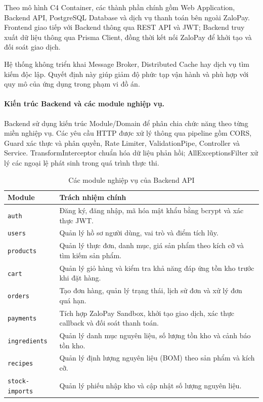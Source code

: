 Theo mô hình C4 Container, các thành phần chính gồm Web Application, Backend API, PostgreSQL Database và dịch vụ thanh toán bên ngoài ZaloPay. Frontend giao tiếp với Backend thông qua REST API và JWT; Backend truy xuất dữ liệu thông qua Prisma Client, đồng thời kết nối ZaloPay để khởi tạo và đối soát giao dịch.

Hệ thống không triển khai Message Broker, Distributed Cache hay dịch vụ tìm kiếm độc lập. Quyết định này giúp giảm độ phức tạp vận hành và phù hợp với quy mô của ứng dụng trong phạm vi đồ án.

\paragraph{Kiến trúc Backend và các module nghiệp vụ.}

Backend sử dụng kiến trúc Module/Domain để phân chia chức năng theo từng miền nghiệp vụ. Các yêu cầu HTTP được xử lý thông qua pipeline gồm CORS, Guard xác thực và phân quyền, Rate Limiter, ValidationPipe, Controller và Service. TransformInterceptor chuẩn hóa dữ liệu phản hồi; AllExceptionsFilter xử lý các ngoại lệ phát sinh trong quá trình thực thi.

\begin{table}[H]
\centering
\small
\caption{Các module nghiệp vụ của Backend API}
\label{tabB:modules}
\begin{tabularx}{\textwidth}{@{}l X@{}}
\toprule
\textbf{Module} & \textbf{Trách nhiệm chính} \\
\midrule
\texttt{auth} &
Đăng ký, đăng nhập, mã hóa mật khẩu bằng bcrypt và xác thực JWT. \\

\texttt{users} &
Quản lý hồ sơ người dùng, vai trò và điểm tích lũy. \\

\texttt{products} &
Quản lý thực đơn, danh mục, giá sản phẩm theo kích cỡ và tìm kiếm sản phẩm. \\

\texttt{cart} &
Quản lý giỏ hàng và kiểm tra khả năng đáp ứng tồn kho trước khi đặt hàng. \\

\texttt{orders} &
Tạo đơn hàng, quản lý trạng thái, lịch sử đơn và xử lý đơn quá hạn. \\

\texttt{payments} &
Tích hợp ZaloPay Sandbox, khởi tạo giao dịch, xác thực callback và đối soát thanh toán. \\

\texttt{ingredients} &
Quản lý danh mục nguyên liệu, số lượng tồn kho và cảnh báo tồn kho. \\

\texttt{recipes} &
Quản lý định lượng nguyên liệu (BOM) theo sản phẩm và kích cỡ. \\

\texttt{stock-imports} &
Quản lý phiếu nhập kho và cập nhật số lượng nguyên liệu. \\
\bottomrule
\end{tabularx}
\end{table}

